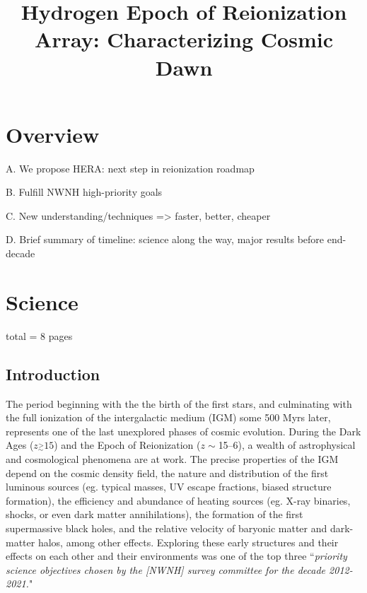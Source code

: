 \documentclass[preprint]{aastex}
\newcommand{\simgt}{\stackrel{>}{_{\sim}}}
\begin{document}
\title{Hydrogen Epoch of Reionization Array: Characterizing Cosmic Dawn}

\section{Overview} %

A. We propose HERA: next step in reionization roadmap

B. Fulfill NWNH high-priority goals

C. New understanding/techniques => faster, better, cheaper

D. Brief summary of timeline: science along the way, major results before end-decade

\section{Science} total = 8 pages

\subsection{Introduction}    %


The period beginning with the the birth of the first stars, and culminating with the full
ionization of the intergalactic medium (IGM) some 500 Myrs later, 
represents one of the last unexplored phases of cosmic evolution. During the Dark Ages
($z\simgt15$) and the Epoch of Reionization ($z\sim$15--6), a wealth
of astrophysical and cosmological phenomena are at work. The precise
properties of the IGM depend on the cosmic density field, the nature
and distribution of the first luminous sources (eg. typical masses, UV
escape fractions, biased structure formation), the efficiency and
abundance of heating sources (eg. X-ray binaries, shocks, or even dark
matter annihilations), the formation of the first supermassive black
holes, and the relative velocity of baryonic matter and dark-matter
halos, among other effects.  Exploring these early structures and
their effects on each other and their environments was one of the top
three ``{\it priority science objectives chosen by the [NWNH] survey
committee for the decade 2012-2021.}"
\end{document}
